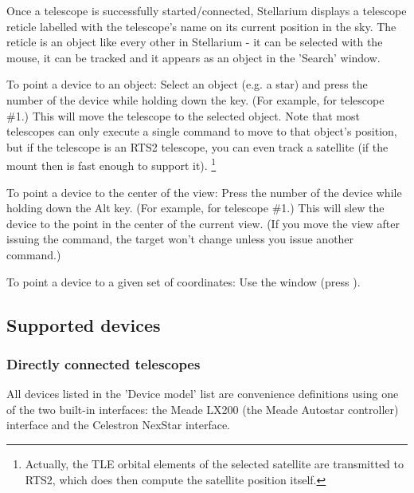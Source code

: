 Once a telescope is successfully started/connected, Stellarium
displays a telescope reticle labelled with the telescope's name on its
current position in the sky. The reticle is an object like every other
in Stellarium - it can be selected with the mouse, it can be tracked
and it appears as an object in the 'Search' window.

To point a device to an object: Select an object (e.g. a star) and
press the number of the device while holding down the \keys{\ctrl} key. (For
example,  for telescope \#1.) This will move the telescope to the
selected object. Note that most telescopes can only execute a single command to 
move to that object's position, but if the telescope is an RTS2 telescope, 
you can even track a satellite (if the mount then is fast enough to support it).%
\footnote{Actually, the TLE orbital elements of the selected satellite are transmitted 
to RTS2, which does then compute the satellite position itself.}

To point a device to the center of the view: Press the number of the
device while holding down the Alt key. (For example,  for
telescope \#1.) This will slew the device to the point in the center of
the current view. (If you move the view after issuing the command, the
target won't change unless you issue another command.)

To point a device to a given set of coordinates: Use the  window (press ).

\subsection{Supported devices}
\label{sec:plugins:TelescopeControl:supported}

\subsubsection{Directly connected telescopes}
All devices listed in the 'Device model' list are convenience
definitions using one of the two built-in interfaces: the Meade LX200
(the Meade Autostar controller) interface and the Celestron NexStar
interface.


